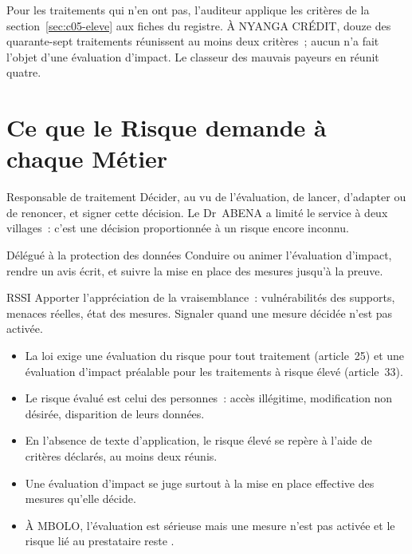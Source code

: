 Pour les traitements qui n'en ont pas, l'auditeur applique les critères de
la section~\ref{sec:c05-eleve} aux fiches du registre. À NYANGA CRÉDIT,
douze des quarante-sept traitements réunissent au moins deux critères~;
aucun n'a fait l'objet d'une évaluation d'impact. Le classeur des mauvais
payeurs en réunit quatre.

\section{Ce que le Risque demande à chaque Métier}
\label{sec:c05-metiers}

\begin{boxmetier}{Responsable de traitement}
Décider, au vu de l'évaluation, de lancer, d'adapter ou de renoncer, et
signer cette décision. Le Dr~ABENA a limité le service à deux villages~:
c'est une décision proportionnée à un risque encore inconnu.
\end{boxmetier}

\begin{boxmetier}{Délégué à la protection des données}
Conduire ou animer l'évaluation d'impact, rendre un avis écrit, et suivre la
mise en place des mesures jusqu'à la preuve.
\end{boxmetier}

\begin{boxmetier}{RSSI}
Apporter l'appréciation de la vraisemblance~: vulnérabilités des supports,
menaces réelles, état des mesures. Signaler quand une mesure décidée n'est
pas activée.
\end{boxmetier}

\begin{boxresume}
\begin{itemize}
    \item La loi exige une évaluation du risque pour tout traitement
          (article~25) et une évaluation d'impact préalable pour les
          traitements à risque élevé (article~33).
    \item Le risque évalué est celui des personnes~: accès illégitime,
          modification non désirée, disparition de leurs données.
    \item En l'absence de texte d'application, le risque élevé se repère à
          l'aide de critères déclarés, au moins deux réunis.
    \item Une évaluation d'impact se juge surtout à la mise en place
          effective des mesures qu'elle décide.
    \item À MBOLO, l'évaluation est sérieuse mais une mesure n'est pas
          activée et le risque lié au prestataire reste \NEK{}.
\end{itemize}
\end{boxresume}

